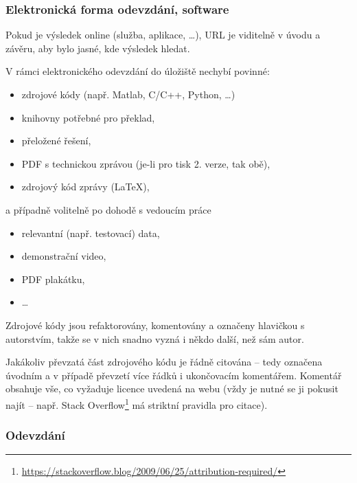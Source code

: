 \subsubsection*{Elektronická forma odevzdání, software}
\begin{checklist}
	\item Pokud je výsledek online (služba, aplikace, \dots), URL je viditelně v úvodu a závěru, aby bylo jasné, kde výsledek hledat.
	\item V rámci elektronického odevzdání do úložiště nechybí povinné: 
    	\begin{itemize}
    		\item zdrojové kódy (např. Matlab, C/C++, Python, \dots)
            \item knihovny potřebné pro překlad,
            \item přeložené řešení,
            \item PDF s technickou zprávou (je-li pro tisk 2. verze, tak obě),
            \item zdrojový kód zprávy (\LaTeX), 
    	\end{itemize}
        a případně volitelně po dohodě s vedoucím práce
		\begin{itemize}
			\item relevantní (např. testovací) data, 
            \item demonstrační video,
            \item PDF plakátku,
            \item \dots
		\end{itemize}        
	\item Zdrojové kódy jsou refaktorovány, komentovány a označeny hlavičkou s autorstvím, takže se v nich snadno vyzná i někdo další, než sám autor.
    \item Jakákoliv převzatá část zdrojového kódu je řádně citována -- tedy označena úvodním a v případě převzetí více řádků i ukončovacím komentářem. Komentář obsahuje vše, co vyžaduje licence uvedená na webu (vždy je nutné se ji pokusit najít -- např. Stack Overflow\footnote{\url{https://stackoverflow.blog/2009/06/25/attribution-required/}} má striktní pravidla pro citace).
\end{checklist}

\subsubsection*{Odevzdání}

